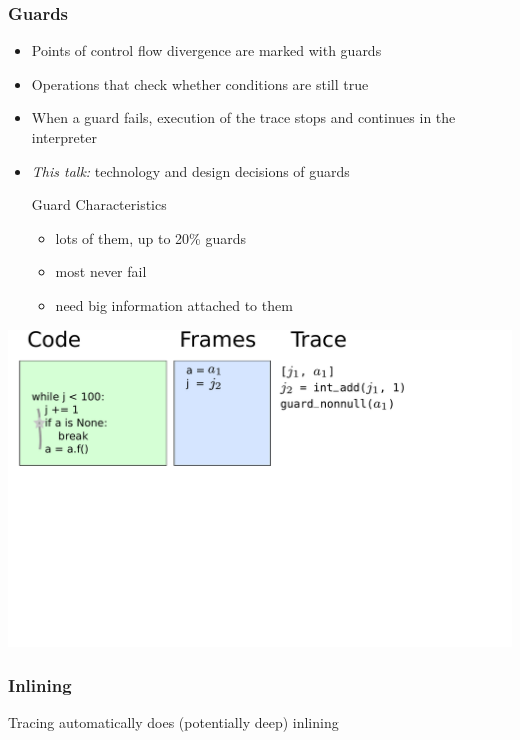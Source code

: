 \documentclass[utf8x]{beamer}
\begin{document}
\begin{frame}
  \frametitle{Guards}
  \begin{itemize}
      \item Points of control flow divergence are marked with guards
      \item Operations that check whether conditions are still true
      \item When a guard fails, execution of the trace stops and continues in the interpreter
      \pause
      \item \emph{This talk:} technology and design decisions of guards
      \pause
      \begin{block}{Guard Characteristics}
          \begin{itemize}
              \item lots of them, up to 20\% guards
              \item most never fail
              \item need big information attached to them
          \end{itemize}
      \end{block}
  \end{itemize}
\end{frame}


\begin{frame}
  \includegraphics[scale=0.4]{figures/loop03}
\end{frame}

\begin{frame}
  \frametitle{Inlining}
  Tracing automatically does (potentially deep) inlining
\end{frame}
\end{document}
